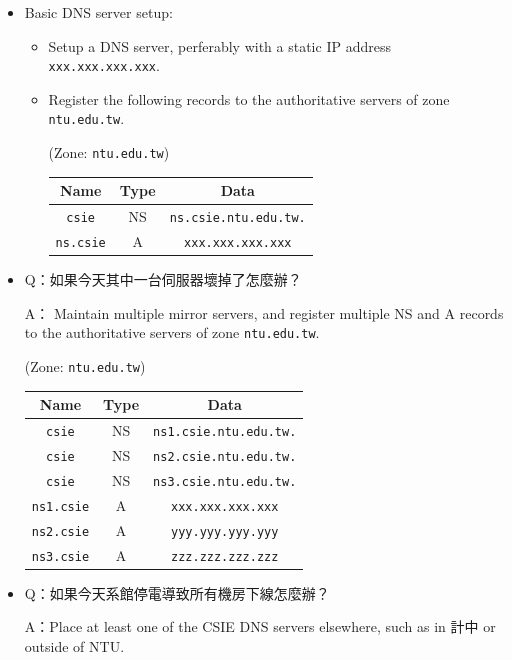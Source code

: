 \documentclass[12pt, a4paper]{article}
\begin{document}
  \begin{itemize}
    \item Basic DNS server setup:
    \begin{itemize}
      \item Setup a DNS server, perferably with a static IP address \verb|xxx.xxx.xxx.xxx|.
      \item Register the following records to the authoritative servers of zone \verb|ntu.edu.tw|.

      (Zone: \verb|ntu.edu.tw|)

      \begin{tabular}{|c|c|c|}
        \hline
        \textbf{Name} & \textbf{Type} & \textbf{Data} \\\hline
        \verb|csie| & NS & \verb|ns.csie.ntu.edu.tw.| \\
        \verb|ns.csie| & A & \verb|xxx.xxx.xxx.xxx| \\\hline
      \end{tabular}
    \end{itemize}
    \item
    Q：如果今天其中一台伺服器壞掉了怎麼辦？

    A：
    Maintain multiple mirror servers, and register multiple NS and A records
    to the authoritative servers of zone \verb|ntu.edu.tw|.

    (Zone: \verb|ntu.edu.tw|)

    \begin{tabular}{|c|c|c|}
      \hline
      \textbf{Name} & \textbf{Type} & \textbf{Data} \\\hline
      \verb|csie| & NS & \verb|ns1.csie.ntu.edu.tw.| \\
      \verb|csie| & NS & \verb|ns2.csie.ntu.edu.tw.| \\
      \verb|csie| & NS & \verb|ns3.csie.ntu.edu.tw.| \\
      \verb|ns1.csie| & A & \verb|xxx.xxx.xxx.xxx| \\
      \verb|ns2.csie| & A & \verb|yyy.yyy.yyy.yyy| \\
      \verb|ns3.csie| & A & \verb|zzz.zzz.zzz.zzz| \\\hline
    \end{tabular}

    \item Q：如果今天系館停電導致所有機房下線怎麼辦？

    A：Place at least one of the CSIE DNS servers elsewhere, such as in 計中
    or outside of NTU.


\end{itemize}
\end{document}

